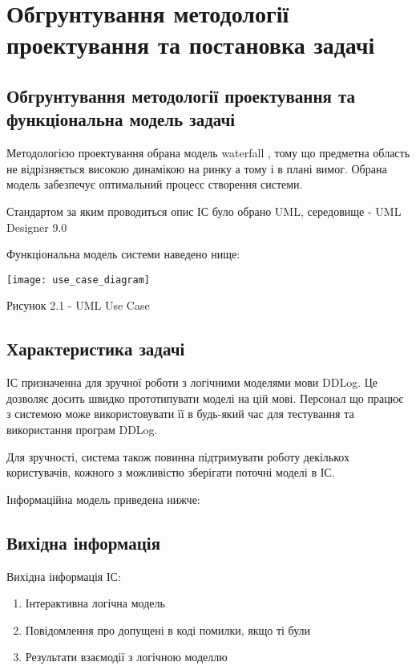 \chapter{Обгрунтування методології проектування та постановка задачі}
\label{chap:second}

\section{Обгрунтування методології проектування та функціональна модель задачі}

Методологією проектування обрана модель waterfall \cite{waterfall}, тому що предметна область не відрізняється високою динамікою на ринку а тому і в плані вимог. Обрана модель забезпечує оптимальний процесс створення системи.

Стандартом за яким проводиться опис ІС було обрано UML, середовище - UML Designer 9.0

Функціональна модель системи наведено нище:

\begin{center}

\texttt{[image: use\_case\_diagram]}

Рисунок 2.1 - UML Use Case
\end{center}

\section{Характеристика задачі}

ІС призначенна для зручної роботи з логічними моделями мови DDLog. Це дозволяє досить швидко прототипувати моделі на цій мові. Персонал що працює з системою може використовувати її в будь-який час для тестування та використання програм DDLog.

Для зручності, система також повинна підтримувати роботу декількох користувачів, кожного з можливістю зберігати поточні моделі в ІС.
 
Інформаційна модель приведена нижче: 

\section{Вихідна інформація}

Вихідна інформація ІС: 

\begin{enumerate}
	\item Інтерактивна логічна модель
	\item Повідомлення про допущені в коді помилки, якщо ті були
	\item Результати взаємодії з логічною моделлю
\end{enumerate}

